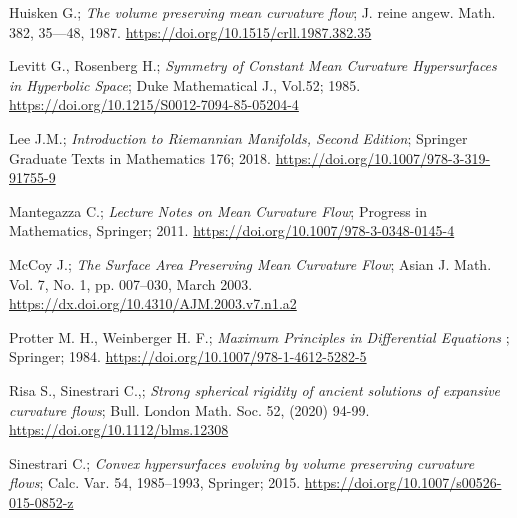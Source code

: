 \documentclass[a4paper, 12pt]{book}
\begin{document}
\begin{thebibliography}{18}
	 Huisken G.; {\em The volume preserving mean curvature flow}; J.  reine  angew.  Math.  382,  35—48, 1987. \href{https://doi.org/10.1515/crll.1987.382.35}{https://doi.org/10.1515/crll.1987.382.35}
	
	 Levitt G., Rosenberg H.;  {\em Symmetry of Constant Mean Curvature Hypersurfaces in Hyperbolic Space}; Duke Mathematical J., Vol.52; 1985. \href{https://doi.org/10.1215/S0012-7094-85-05204-4}{https://doi.org/10.1215/S0012-7094-85-05204-4}
	
	 Lee J.M.; {\em Introduction to Riemannian Manifolds, Second Edition};  Springer Graduate Texts in Mathematics 176; 2018. \href{https://doi.org/10.1007/978-3-319-91755-9}{https://doi.org/10.1007/978-3-319-91755-9}
	
	 Mantegazza C.; {\em Lecture Notes on Mean Curvature Flow}; Progress in Mathematics, Springer; 2011. \href{https://doi.org/10.1007/978-3-0348-0145-4}{https://doi.org/10.1007/978-3-0348-0145-4}
	
	 McCoy J.; {\em The Surface Area Preserving Mean Curvature Flow}; Asian J. Math. Vol. 7, No. 1, pp. 007–030, March 2003. \href{https://dx.doi.org/10.4310/AJM.2003.v7.n1.a2}{https://dx.doi.org/10.4310/AJM.2003.v7.n1.a2}
	
	  Protter M. H.,  Weinberger H. F.; {\em Maximum Principles in Differential Equations };  Springer; 1984. \href{https://doi.org/10.1007/978-1-4612-5282-5}{https://doi.org/10.1007/978-1-4612-5282-5}
	
	  Risa S., Sinestrari C.,; {\em Strong spherical rigidity of ancient solutions of expansive curvature flows};  Bull. London Math. Soc. 52, (2020) 94-99. \href{https://doi.org/10.1112/blms.12308}{https://doi.org/10.1112/blms.12308}
	
	 Sinestrari C.; {\em Convex hypersurfaces evolving by volume preserving curvature flows};  Calc. Var. 54, 1985–1993, Springer; 2015. \href{https://doi.org/10.1007/s00526-015-0852-z}{https://doi.org/10.1007/s00526-015-0852-z}
	
	
	
	
	
	
\end{thebibliography}
%
\end{document}
